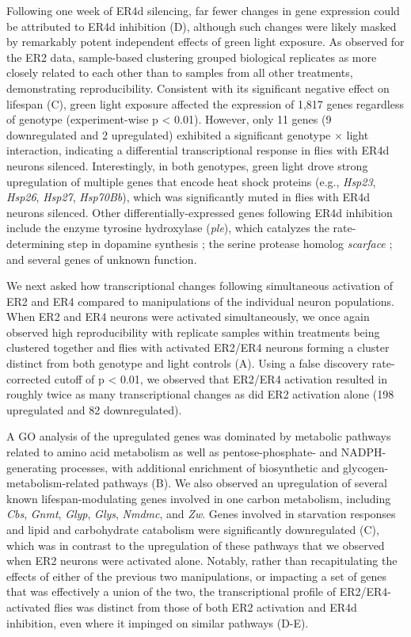 Following one week of ER4d silencing, far fewer changes in gene expression could be attributed to ER4d inhibition (D), although such changes were likely masked by remarkably potent independent effects of green light exposure. 
As observed for the ER2 data, sample-based clustering grouped biological replicates as more closely related to each other than to samples from all other treatments, demonstrating reproducibility. 
Consistent with its significant negative effect on lifespan (C), green light exposure affected the expression of 1,817 genes regardless of genotype (experiment-wise p < 0.01). 
However, only 11 genes (9 downregulated and 2 upregulated) exhibited a significant genotype $\times$ light interaction, indicating a differential transcriptional response in flies with ER4d neurons silenced. 
Interestingly, in both genotypes, green light drove strong upregulation of multiple genes that encode heat shock proteins (e.g., \textit{Hsp23}, \textit{Hsp26}, \textit{Hsp27}, \textit{Hsp70Bb}), which was significantly muted in flies with ER4d neurons silenced. 
Other differentially-expressed genes following ER4d inhibition include the enzyme tyrosine hydroxylase (\textit{ple}), which catalyzes the rate-determining step in dopamine synthesis \citep{neckameyer1993}; the serine protease homolog \textit{scarface} \citep{prasad2018}; and several genes of unknown function. 

We next asked how transcriptional changes following simultaneous activation of ER2 and ER4 compared to manipulations of the individual neuron populations. 
When ER2 and ER4 neurons were activated simultaneously, we once again observed high reproducibility with replicate samples within treatments being clustered together and flies with activated ER2/ER4 neurons forming a cluster distinct from both genotype and light controls (A). 
Using a false discovery rate-corrected cutoff of p < 0.01, we observed that ER2/ER4 activation resulted in roughly twice as many transcriptional changes as did ER2 activation alone (198 upregulated and 82 downregulated). 

A GO analysis of the upregulated genes was dominated by metabolic pathways related to amino acid metabolism as well as pentose-phosphate- and NADPH-generating processes, with additional enrichment of biosynthetic and glycogen-metabolism-related pathways (B). 
We also observed an upregulation of several known lifespan-modulating genes involved in one carbon metabolism, including \textit{Cbs}, \textit{Gnmt}, \textit{Glyp}, \textit{Glys}, \textit{Nmdmc}, and \textit{Zw}. 
Genes involved in starvation responses and lipid and carbohydrate catabolism were significantly downregulated (C), which was in contrast to the upregulation of these pathways that we observed when ER2 neurons were activated alone. 
Notably, rather than recapitulating the effects of either of the previous two manipulations, or impacting a set of genes that was effectively a union of the two, the transcriptional profile of ER2/ER4-activated flies was distinct from those of both ER2 activation and ER4d inhibition, even where it impinged on similar pathways (D-E). 

